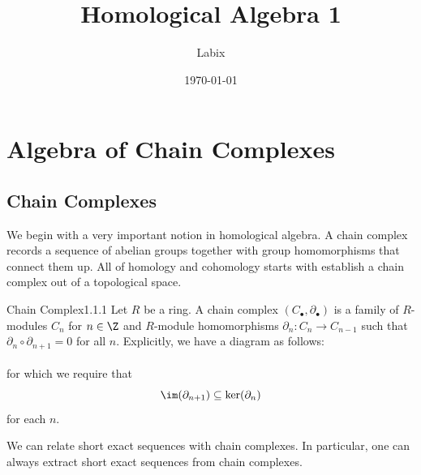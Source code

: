 \documentclass[a4paper]{article}
\title{Homological Algebra 1}
\author{Labix}
\date{\today}
\begin{document}
\maketitle
\begin{abstract}
\end{abstract}
\pagebreak
\tableofcontents

\pagebreak
\section{Algebra of Chain Complexes}
\subsection{Chain Complexes}
We begin with a very important notion in homological algebra. A chain complex records a sequence of abelian groups together with group homomorphisms that connect them up. All of homology and cohomology starts with establish a chain complex out of a topological space. 

\begin{defn}{Chain Complex}{1.1.1} Let $R$ be a ring. A chain complex $(C_\bullet,\partial_\bullet)$ is a family of $R$-modules $C_n$ for $n\in\Z$ and $R$-module homomorphisms $\partial_n:C_n\to C_{n-1}$ such that $\partial_n\circ\partial_{n+1}=0$ for all $n$. Explicitly, we have a diagram as follows: \\
\\
for which we require that $$\im(\partial_{n+1})\subseteq\ker(\partial_n)$$ for each $n$. 
\end{defn}

We can relate short exact sequences with chain complexes. In particular, one can always extract short exact sequences from chain complexes. 
\end{document}
